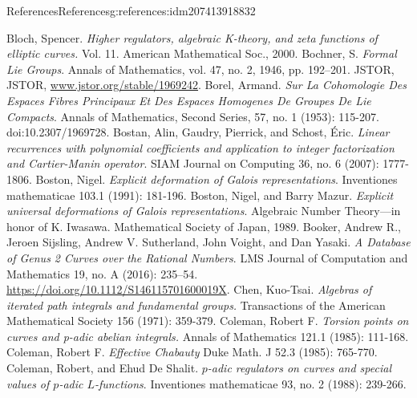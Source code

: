 \documentclass[oneside,10pt,]{book}
\numberwithin{equation}{section}
\begin{document}
\begin{references-chapter-numberless}{References}{}{References}{}{}{g:references:idm207413918832}
\begin{thebibliography}{9}
\hypertarget{x:biblio:bib-bloch}{}Bloch, Spencer.  \textit{Higher regulators, algebraic K-theory, and zeta functions of elliptic curves.} Vol. 11. American Mathematical Soc., 2000.
\hypertarget{x:biblio:bib-bochner-formal}{}Bochner, S. \textit{Formal Lie Groups}. Annals of Mathematics, vol. 47, no. 2, 1946, pp. 192–201. JSTOR, JSTOR, \url{www.jstor.org/stable/1969242}.
\hypertarget{x:biblio:bib-borel-hopf}{}Borel, Armand. \textit{Sur La Cohomologie Des Espaces Fibres Principaux Et Des Espaces Homogenes De Groupes De Lie Compacts}. Annals of Mathematics, Second Series, 57, no. 1 (1953): 115-207. doi:10.2307\slash{}1969728.
\hypertarget{x:biblio:bib-bostan-gaudry-schost}{}Bostan, Alin, Gaudry, Pierrick, and Schost, Éric. \textit{Linear recurrences with polynomial coefficients and application to integer factorization and Cartier-Manin operator}. SIAM Journal on Computing 36, no. 6 (2007): 1777-1806.
\hypertarget{x:biblio:bib-boston-explicit}{}Boston, Nigel. \textit{Explicit deformation of Galois representations}. Inventiones mathematicae 103.1 (1991): 181-196.
\hypertarget{x:biblio:bib-boston-mazur}{}Boston, Nigel, and Barry Mazur. \textit{Explicit universal deformations of Galois representations}. Algebraic Number Theory—in honor of K. Iwasawa. Mathematical Society of Japan, 1989.
\hypertarget{x:biblio:bib-booker-database-genus-2}{}Booker, Andrew R., Jeroen Sijsling, Andrew V. Sutherland, John Voight, and Dan Yasaki. \textit{A Database of Genus 2 Curves over the Rational Numbers}. LMS Journal of Computation and Mathematics 19, no. A (2016): 235–54. \url{https://doi.org/10.1112/S146115701600019X}.
\hypertarget{x:biblio:bib-chen}{}Chen, Kuo-Tsai.  \textit{Algebras of iterated path integrals and fundamental groups.} Transactions of the American Mathematical Society 156 (1971): 359-379.
\hypertarget{x:biblio:bib-coleman-torsion}{}Coleman, Robert F.  \textit{Torsion points on curves and p-adic abelian integrals.} Annals of Mathematics 121.1 (1985): 111-168.
\hypertarget{x:biblio:bib-coleman-chabauty}{}Coleman, Robert F.  \textit{Effective Chabauty} Duke Math. J 52.3 (1985): 765-770.
\hypertarget{x:biblio:bib-coleman-de-shalit}{}Coleman, Robert, and Ehud De Shalit. \textit{\(p\)-adic regulators on curves and special values of \(p\)-adic \(L\)-functions}. Inventiones mathematicae 93, no. 2 (1988): 239-266.

\end{thebibliography}
\end{references-chapter-numberless}
\end{document}
